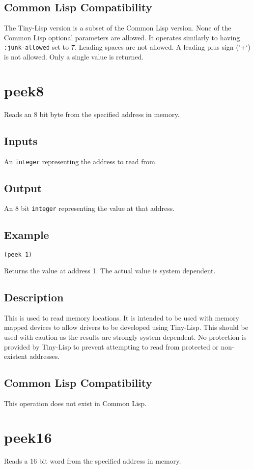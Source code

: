 \documentclass[10pt, openany]{book}
\newcommand{\constant}[1]{\emph{\texttt{#1}}}
\newcommand{\keyword}[1]{\texttt{#1}}
\newcommand{\datatype}[1]{\texttt{#1}}
\newcommand{\tl}{Tiny-Lisp}
\newcommand{\cl}{Common Lisp}
\begin{document}
\subsection{Common Lisp Compatibility}
The \tl{} version is a subset of the \cl{} version.  None of the \cl{} optional parameters are allowed.  It operates similarly to having \keyword{:junk-allowed} set to \constant{T}. Leading spaces are not allowed.  A leading plus sign ('+`) is not allowed.  Only a single value is returned.

\section{peek8}
Reads an 8 bit byte from the specified address in memory.
\subsection{Inputs}
An \datatype{integer} representing the address to read from.
\subsection{Output}
An 8 bit \datatype{integer} representing the value at that address.
\subsection{Example}
\begin{lstlisting}
(peek 1)
\end{lstlisting}
Returns the value at address 1.  The actual value is system dependent.
\subsection{Description}
This is used to read memory locations.  It is intended to be used with memory mapped devices to allow drivers to be developed using \tl{}.  This should be used with caution as the results are strongly system dependent.  No protection is provided by \tl{} to prevent attempting to read from protected or non-existent addresses.
\subsection{Common Lisp Compatibility}
This operation does not exist in \cl.

\section{peek16}
Reads a 16 bit word from the specified address in memory.
\end{document}
